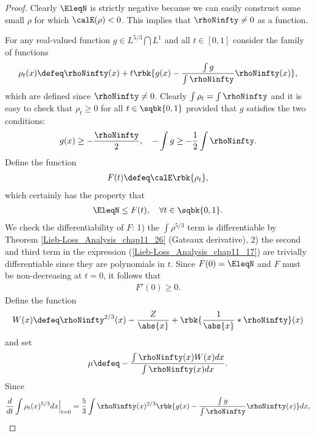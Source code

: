 \documentclass[openany, a4paper, oneside]{jsbook}
\begin{document}
\begin{proof}
Clearly $\EleqN$ is strictly negative because we can easily construct some small $\rho$ for which $\calE (\rho) < 0$.
This implies that $\rhoNinfty \neq 0$ as a function.

For any real-valued function $g \in L^{5/3} \bigcap L^1$ and all $t \in [0, 1]$ consider the family of functions
\begin{align}
 \rho_t (x)
 \defeq
 \rhoNinfty (x) + t \rbk{ g (x) - \frac{\int g}{\int \rhoNinfty} \rhoNinfty (x)},
\end{align}
which are defined since $\rhoNinfty \neq 0$.
Clearly $\int \rho_t = \int \rhoNinfty$ and it is easy to check that $\rho_t \geq 0$ for all $t \in \sqbk{0, 1}$
provided that $g$ satisfies the two conditions:
\begin{align}
 g (x) \geq - \frac{\rhoNinfty}{2}, \quad
 -\int g \geq - \frac{1}{2} \int \rhoNinfty.
\end{align}
Define the function
\begin{align}
 F (t)
 \defeq
 \calE \rbk{\rho_t},
\end{align}
which certainly has the property that
\begin{align}
 \EleqN
 \leq
 F (t),
 \quad \forall t \in \sqbk{0, 1}. \label{Lieb-Loss_Analysis_chap11_27}
\end{align}
We check the differentiability of $F$:
1) the $\int \rho^{5/3}$ term is differentiable by Theorem \ref{Lieb-Loss_Analysis_chap11_26} (Gateaux derivative),
2) the second and third term in the expression (\ref{Lieb-Loss_Analysis_chap11_17}) are trivially differentiable
   since they are polynomials in $t$.
Since $F (0) = \EleqN$ and $F$ must be non-decreasing at $t=0$, it follows that
\begin{align}
 F'(0)
 \geq 0.
\end{align}
Define the function
\begin{align}
 W (x)
 \defeq
 \rhoNinfty^{2/3}(x) - \frac{Z}{\abs{x}} + \rbk{\frac{1}{\abs{x}} * \rhoNinfty} (x)
\end{align}
and set
\begin{align}
 \mu
 \defeq
 -\frac{\int \rhoNinfty (x) W (x) dx}{\int \rhoNinfty (x) dx}. \label{Lieb-Loss_Analysis_chap11_30}
\end{align}
Since
\begin{align}
 \frac{d}{dt} \int \rho_t (x)^{5/3} dx \Big |_{t = 0}
 &=
 \frac{5}{3} \int \rhoNinfty (x)^{2/3} \rbk{g (x) - \frac{\int g}{\int \rhoNinfty} \rhoNinfty (x)} dx, \\

\end{align}
\end{proof}
\end{document}
